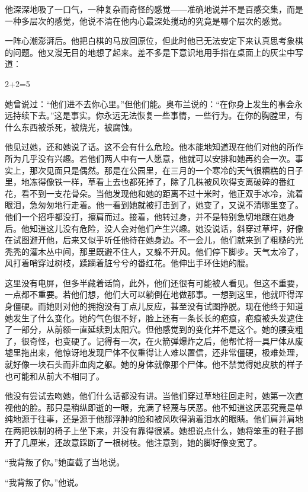 他深深地吸了一口气，一种复杂而奇怪的感觉——准确地说并不是百感交集，而是一种多层次的感觉，他说不清在他内心最深处搅动的究竟是哪个层次的感觉。

一阵心潮澎湃后。他把白棋的马放回原位，但此时他已无法安定下来认真思考象棋的问题。他又漫无目的地想了起来。差不多是下意识地用手指在桌面上的灰尘中写道：

2+2=5

她曾说过：``他们进不去你心里。''但他们能。奥布兰说的：``在你身上发生的事会永远持续下去。''这是事实。你永远无法恢复一些事情，一些行为。在你的胸膛里，有什么东西被杀死，被烧光，被腐蚀。

他见过她，还和她说了话。这不会有什么危险。他本能地知道现在他们对他的所作所为几乎没有兴趣。若他们两人中有一人愿意，他就可以安排和她再约会一次。事实上，那次见面只是偶然。那是在公园里，在三月的一个寒冷的天气很糟糕的日子里，地冻得像铁一样，草看上去也都死掉了，除了几株被风吹得支离破碎的番红花，看不到一支花骨朵。当他发现他和她的距离不过十米时，他正双手冰冷，流着眼泪，急匆匆地行走着。他一看到她就被打击到了，她变了，又说不清哪里变了。他们一个招呼都没打，擦肩而过。接着，他转过身，并不是特别急切地跟在她身后。他知道这儿没有危险，没人会对他们产生兴趣。她没说话，斜穿过草坪，好像在试图避开他，后来又似乎听任他待在她身边。不一会儿，他们就来到了粗糙的光秃秃的灌木丛中间，那里既避不住人，又躲不开风。他们停下脚步。天气太冷了，风打着哨穿过树枝，蹂躏着脏兮兮的番红花。他伸出手环住她的腰。

这里没有电屏，但多半藏着话筒，此外，他们还很有可能被人看见。但这不重要，一点都不重要。若他们想，他们大可以躺倒在地做那事。一想到这里，他就吓得浑身僵硬。而她则对他的拥抱没有丁点儿反应，甚至没有试图挣脱。现在他终于知道她发生了什么变化。她的气色很不好，脸上还有一条长长的疤痕，疤痕被头发遮住了一部分，从前额一直延续到太阳穴。但他感觉到的变化并不是这个。她的腰变粗了，很奇怪，也变硬了。记得有一次，在火箭弹爆炸之后，他帮忙将一具尸体从废墟里拖出来，他惊讶地发现尸体不仅重得让人难以置信，还非常僵硬，极难处理，就好像一块石头而非血肉之躯。她的身体就像那个尸体。他不禁觉得她皮肤的样子也可能和从前大不相同了。

他没有尝试去吻她，他们什么话都没有讲。当他们穿过草地往回走时，她第一次直视他的脸。那只是稍纵即逝的一眼，充满了轻蔑与厌恶。他不知道这厌恶究竟是单纯地源于往事，还是源于他那浮肿的脸和被风吹得淌着泪水的眼睛。他们肩并肩地在两把铁制的椅子上坐下来，并没有靠得很紧。她想说点什么，她将笨重的鞋子挪开了几厘米，还故意踩断了一根树枝。他注意到，她的脚好像变宽了。

``我背叛了你。''她直截了当地说。

``我背叛了你。''他说。

